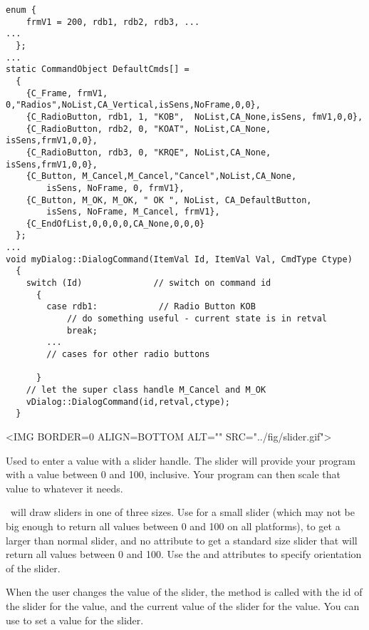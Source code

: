 \footnotesize
\begin{verbatim}
enum {
    frmV1 = 200, rdb1, rdb2, rdb3, ...
...
  };
...
static CommandObject DefaultCmds[] =
  {
    {C_Frame, frmV1, 0,"Radios",NoList,CA_Vertical,isSens,NoFrame,0,0},
    {C_RadioButton, rdb1, 1, "KOB",  NoList,CA_None,isSens, fmV1,0,0},
    {C_RadioButton, rdb2, 0, "KOAT", NoList,CA_None, isSens,frmV1,0,0},
    {C_RadioButton, rdb3, 0, "KRQE", NoList,CA_None, isSens,frmV1,0,0},
    {C_Button, M_Cancel,M_Cancel,"Cancel",NoList,CA_None,
        isSens, NoFrame, 0, frmV1},
    {C_Button, M_OK, M_OK, " OK ", NoList, CA_DefaultButton, 
        isSens, NoFrame, M_Cancel, frmV1},
    {C_EndOfList,0,0,0,0,CA_None,0,0,0}
  };
...
void myDialog::DialogCommand(ItemVal Id, ItemVal Val, CmdType Ctype)
  {
    switch (Id)              // switch on command id
      {
        case rdb1:            // Radio Button KOB
            // do something useful - current state is in retval
            break;
        ...
        // cases for other radio buttons

      }
    // let the super class handle M_Cancel and M_OK
    vDialog::DialogCommand(id,retval,ctype);
  }
\end{verbatim}
\normalfont\normalsize


\small
\begin{rawhtml}
<IMG BORDER=0 ALIGN=BOTTOM ALT="" SRC="../fig/slider.gif">
\end{rawhtml}
\begin{latexonly}

\end{latexonly}
\normalfont\normalsize
\vspace{.1in}

Used to enter a value with a slider handle. The slider will provide
your program with a value between 0 and 100, inclusive. Your program
can then scale that value to whatever it needs.

\V\ will draw sliders in one of three sizes. Use 
for a small slider (which may not be big enough to return all
values between 0 and 100 on all platforms),  to
get a larger than normal slider, and no attribute to get a standard
size slider that will return all values between 0 and 100. Use
the  and  attributes to
specify orientation of the slider.

When the user changes the value of the slider, the 
method is called with the id of the slider for the  value,
and the current value of the slider for the  value.
You can use  to set a value for the slider.

